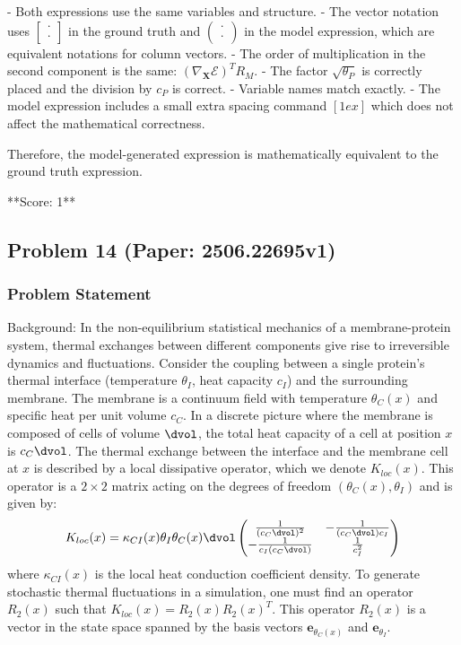 \documentclass[10pt]{article}
\begin{document}
- Both expressions use the same variables and structure.
- The vector notation uses \(\left[\begin{array}{c} \cdot \\ \cdot \end{array}\right]\) in the ground truth and \(\begin{pmatrix} \cdot \\ \cdot \end{pmatrix}\) in the model expression, which are equivalent notations for column vectors.
- The order of multiplication in the second component is the same: \((\nabla_{\mathbf{X}} \mathcal{E})^T R_M\).
- The factor \(\sqrt{\theta_P}\) is correctly placed and the division by \(c_P\) is correct.
- Variable names match exactly.
- The model expression includes a small extra spacing command \([1ex]\) which does not affect the mathematical correctness.

Therefore, the model-generated expression is mathematically equivalent to the ground truth expression.

**Score: 1**

\newpage
\subsection*{Problem 14 (Paper: 2506.22695v1)}
\subsubsection*{Problem Statement}
Background:
In the non-equilibrium statistical mechanics of a membrane-protein system, thermal exchanges between different components give rise to irreversible dynamics and fluctuations. Consider the coupling between a single protein's thermal interface (temperature $\theta_I$, heat capacity $c_I$) and the surrounding membrane. The membrane is a continuum field with temperature $\theta_C(x)$ and specific heat per unit volume $c_C$. In a discrete picture where the membrane is composed of cells of volume $\dvol$, the total heat capacity of a cell at position $x$ is $c_C \dvol$. The thermal exchange between the interface and the membrane cell at $x$ is described by a local dissipative operator, which we denote $K_{loc}(x)$. This operator is a $2 \times 2$ matrix acting on the degrees of freedom $(\theta_C(x), \theta_I)$ and is given by:
\begin{equation*}
K_{loc}(x) = \kappa_{CI}(x)\theta_I\theta_C(x)\dvol \begin{pmatrix} \frac{1}{(c_C \dvol)^2} & -\frac{1}{(c_C \dvol) c_I} \\ -\frac{1}{c_I (c_C \dvol)} & \frac{1}{c_I^2} \end{pmatrix}
\end{equation*}
where $\kappa_{CI}(x)$ is the local heat conduction coefficient density. To generate stochastic thermal fluctuations in a simulation, one must find an operator $R_2(x)$ such that $K_{loc}(x) = R_2(x) R_2(x)^T$. This operator $R_2(x)$ is a vector in the state space spanned by the basis vectors $\mathbf{e}_{\theta_C(x)}$ and $\mathbf{e}_{\theta_I}$.
\end{document}
